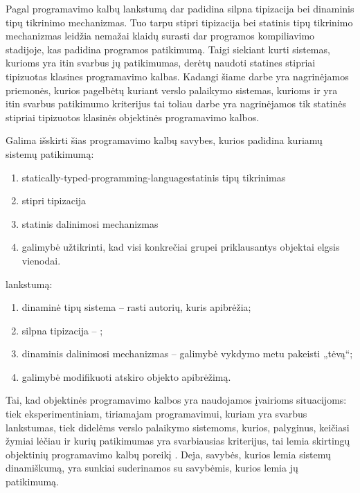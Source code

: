 Pagal \cite[2]{Madsen:1990:STO:97946.97964} programavimo kalbų
lankstumą dar padidina silpna tipizacija bei dinaminis tipų tikrinimo
mechanizmas. Tuo tarpu stipri tipizacija bei statinis tipų tikrinimo
mechanizmas leidžia nemažai klaidų surasti dar programos kompiliavimo
stadijoje, kas padidina programos patikimumą. Taigi siekiant kurti
sistemas, kurioms yra itin svarbus jų patikimumas, derėtų naudoti
statines stipriai tipizuotas klasines programavimo kalbas. Kadangi
šiame darbe yra nagrinėjamos priemonės, kurios pagelbėtų kuriant
verslo palaikymo sistemas, kurioms ir yra itin svarbus patikimumo
kriterijus tai toliau darbe yra nagrinėjamos tik statinės stipriai
tipizuotos klasinės objektinės programavimo kalbos.

Galima išskirti šias programavimo kalbų savybes, kurios padidina
kuriamų sistemų patikimumą\cite{Lieberman:1987:TO:62139.62144}:
\begin{enumerate}
  \item \gls{statically-typed-programming-language}{statinis tipų
    tikrinimas}
  \item stipri tipizacija 
  \item statinis dalinimosi
    mechanizmas\cite{Lieberman:1987:TO:62139.62144}
  \item galimybė užtikrinti, kad visi konkrečiai grupei priklausantys
    objektai elgsis vienodai\cite{Lieberman:1987:TO:62139.62144}.
\end{enumerate}

lankstumą\cite{Lieberman:1987:TO:62139.62144}:
\begin{enumerate}
  \item dinaminė tipų sistema – rasti autorių, kuris apibrėžia;
  \item silpna tipizacija  – 
    \cite[168]{Wegner:1987:DOL:38807.38823};
  \item dinaminis dalinimosi
    mechanizmas\cite{Lieberman:1987:TO:62139.62144} – galimybė
    vykdymo metu pakeisti „tėvą“;
  \item galimybė modifikuoti atskiro objekto
    apibrėžimą\cite{Lieberman:1987:TO:62139.62144}.
\end{enumerate}

Tai, kad objektinės programavimo kalbos yra naudojamos įvairioms
situacijoms: tiek eksperimentiniam, tiriamajam programavimui,
kuriam yra svarbus lankstumas, tiek didelėms verslo palaikymo
sistemoms, kurios, palyginus, keičiasi žymiai lėčiau ir kurių
patikimumas yra svarbiausias kriterijus, tai lemia skirtingų
objektinių programavimo kalbų poreikį
. Deja, savybės, kurios lemia
sistemų dinamiškumą, yra sunkiai suderinamos su savybėmis,
kurios lemia jų patikimumą.

